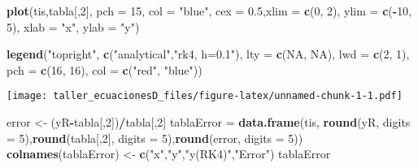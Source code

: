 \documentclass[]{article}
\newenvironment{Shaded}{\begin{snugshade}}{\end{snugshade}}
\newcommand{\KeywordTok}[1]{\textcolor[rgb]{0.13,0.29,0.53}{\textbf{#1}}}
\newcommand{\DataTypeTok}[1]{\textcolor[rgb]{0.13,0.29,0.53}{#1}}
\newcommand{\DecValTok}[1]{\textcolor[rgb]{0.00,0.00,0.81}{#1}}
\newcommand{\FloatTok}[1]{\textcolor[rgb]{0.00,0.00,0.81}{#1}}
\newcommand{\StringTok}[1]{\textcolor[rgb]{0.31,0.60,0.02}{#1}}
\newcommand{\OtherTok}[1]{\textcolor[rgb]{0.56,0.35,0.01}{#1}}
\newcommand{\OperatorTok}[1]{\textcolor[rgb]{0.81,0.36,0.00}{\textbf{#1}}}
\newcommand{\NormalTok}[1]{#1}
\begin{document}
\begin{Shaded}
\begin{Highlighting}[]
\KeywordTok{plot}\NormalTok{(tis,tabla[,}\DecValTok{2}\NormalTok{], }\DataTypeTok{pch =} \DecValTok{15}\NormalTok{, }\DataTypeTok{col =} \StringTok{"blue"}\NormalTok{, }\DataTypeTok{cex =} \FloatTok{0.5}\NormalTok{,}\DataTypeTok{xlim =} \KeywordTok{c}\NormalTok{(}\DecValTok{0}\NormalTok{, }\DecValTok{2}\NormalTok{), }\DataTypeTok{ylim =} \KeywordTok{c}\NormalTok{(}\OperatorTok{-}\DecValTok{10}\NormalTok{, }\DecValTok{5}\NormalTok{), }\DataTypeTok{xlab =} \StringTok{"x"}\NormalTok{, }\DataTypeTok{ylab =} \StringTok{"y"}\NormalTok{)}

\KeywordTok{legend}\NormalTok{(}\StringTok{"topright"}\NormalTok{,}
       \KeywordTok{c}\NormalTok{(}\StringTok{"analytical"}\NormalTok{,}\StringTok{"rk4, h=0.1"}\NormalTok{),}
       \DataTypeTok{lty =} \KeywordTok{c}\NormalTok{(}\OtherTok{NA}\NormalTok{, }\OtherTok{NA}\NormalTok{), }\DataTypeTok{lwd =} \KeywordTok{c}\NormalTok{(}\DecValTok{2}\NormalTok{, }\DecValTok{1}\NormalTok{),}
       \DataTypeTok{pch =} \KeywordTok{c}\NormalTok{(}\DecValTok{16}\NormalTok{, }\DecValTok{16}\NormalTok{),}
       \DataTypeTok{col =} \KeywordTok{c}\NormalTok{(}\StringTok{"red"}\NormalTok{, }\StringTok{"blue"}\NormalTok{))}
\end{Highlighting}
\end{Shaded}

\texttt{[image: taller\_ecuacionesD\_files/figure-latex/unnamed-chunk-1-1.pdf]}

\begin{Shaded}
\begin{Highlighting}[]
\NormalTok{error <-}\StringTok{ }\NormalTok{(yR}\OperatorTok{-}\NormalTok{tabla[,}\DecValTok{2}\NormalTok{])}\OperatorTok{/}\NormalTok{tabla[,}\DecValTok{2}\NormalTok{]}
\NormalTok{tablaError =}\StringTok{ }\KeywordTok{data.frame}\NormalTok{(tis, }\KeywordTok{round}\NormalTok{(yR, }\DataTypeTok{digits =} \DecValTok{5}\NormalTok{),}\KeywordTok{round}\NormalTok{(tabla[,}\DecValTok{2}\NormalTok{], }\DataTypeTok{digits =} \DecValTok{5}\NormalTok{),}\KeywordTok{round}\NormalTok{(error, }\DataTypeTok{digits =} \DecValTok{5}\NormalTok{))}
\KeywordTok{colnames}\NormalTok{(tablaError) <-}\StringTok{ }\KeywordTok{c}\NormalTok{(}\StringTok{"x"}\NormalTok{,}\StringTok{"y"}\NormalTok{,}\StringTok{"y(RK4)"}\NormalTok{,}\StringTok{"Error"}\NormalTok{)}
\NormalTok{tablaError}
\end{Highlighting}
\end{Shaded}
\end{document}
